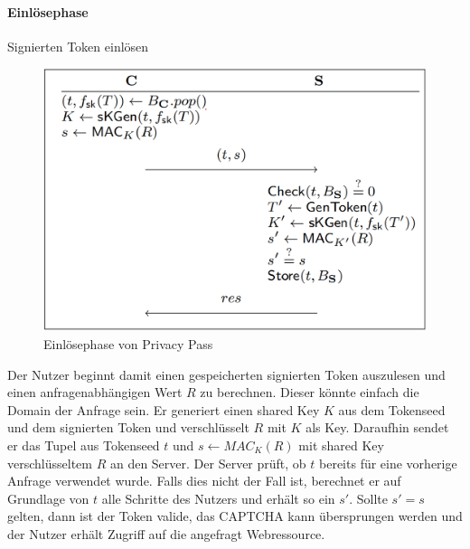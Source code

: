 \documentclass[11pt,a4paper]{scrreprt}
\begin{document}
\paragraph{Einlösephase} Signierten Token einlösen\\
\begin{figure}[H]
    \centering
    \includegraphics[width=0.5\linewidth]{pp-redemptionphase.png} 
    \caption{Einlösephase von Privacy Pass \cite{pp-davidson2018privacy}}
    \label{fig:pp-redemptoinphase}
\end{figure}
Der Nutzer beginnt damit einen gespeicherten signierten Token auszulesen und einen anfragenabhängigen Wert $R$ zu berechnen. Dieser könnte einfach die Domain der Anfrage sein. Er generiert einen shared Key $K$ aus dem Tokenseed und dem signierten Token und verschlüsselt $R$ mit $K$ als Key. Daraufhin sendet er das Tupel aus Tokenseed $t$ und $s\leftarrow MAC_{K}(R)$ mit shared Key verschlüsseltem $R$ an den Server. Der Server prüft, ob $t$ bereits für eine vorherige Anfrage verwendet wurde. Falls dies nicht der Fall ist, berechnet er auf Grundlage von $t$ alle Schritte des Nutzers und erhält so ein $s'$. Sollte $s'=s$ gelten, dann ist der Token valide, das CAPTCHA kann übersprungen werden und der Nutzer erhält Zugriff auf die angefragt Webressource.
\end{document}
